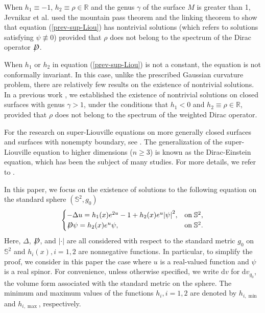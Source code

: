 \documentclass[a4paper, 12pt]{article}
\def\slashiii#1{\setbox0=\hbox{$#1$}#1\hskip-\wd0\hbox to\wd0{\hss\sl/\/\hss}}
\begin{document}
	When $h_1 \equiv-1$, $h_2 \equiv \rho\in\mathbb{R}$ and the genus $\gamma$ of the surface $M$ is greater than 1,  Jevnikar et al. \cite{jevnikar2020existence1} used the mountain pass theorem and the linking theorem to show that equation (\ref{prev-sup-Liou}) has nontrivial solutions (which refers to solutions satisfying $\psi\not \equiv0$) provided that $\rho$ does not belong to the spectrum of the Dirac operator $\slashiii{D}$.
	
	When $h_1$ or $h_2$ in equation (\ref{prev-sup-Liou}) is not a constant, the equation is not conformally invariant. In this case, unlike the prescribed Gaussian curvature problem, there are relatively few results on the existence of nontrivial solutions. In a previous work \cite{han2024existence}, we established the existence of nontrivial solutions on closed surfaces with genus $\gamma > 1$, under the conditions that $h_1 < 0$ and $h_2 \equiv \rho \in \mathbb{R}$, provided that $\rho$ does not belong to the spectrum of the weighted Dirac operator.
	
	For the research on super-Liouville equations on more generally closed surfaces and surfaces with nonempty boundary, see \cite{jevnikar2020existence1,MR4206467,jost2007super,jost2009energy,jost2014boundary,jost2014qualitative,jost2015local}. 	 The generalization of the super-Liouville equation to higher dimensions (\(n \geq 3\)) is known as the Dirac-Einstein equation, which has been the subject of many studies. For more details, we refer to \cite{MR4267625,MR4505161,MR1709232,MR1793008,MR1738150,MR3906258,MR4844577,MR4707830}.
	
	In this paper, we focus on the existence of solutions to the following equation on the standard sphere $(\mathbb{S}^2,g_0)$
	\begin{equation}\label{key-Sphere}
		\begin{cases}
			{ - \Delta u = {h_1}(x){e^{2u}} - 1 + {h_2(x)}{e^{u}}{{\left| \psi  \right|}^2},}&{{\text{on}}\;{\mathbb{S}^2},} \\
			{\slashiii{D}\psi  = h_2(x){e^{u}}\psi ,}&{{\text{on}}\;{\mathbb{S}^2}.}
		\end{cases}
	\end{equation}
	Here, $\Delta$, $\slashiii{D}$, and \( \left|  \cdot  \right| \) are all considered with respect to the standard metric \( g_0 \) on $\mathbb{S}^2$ and $h_i(x),i=1,2$ are nonnegative functions. In particular, to simplify the proof, we consider in this paper the case where \( u \) is a real-valued function and \( \psi \) is a real spinor. For convenience, unless otherwise specified, we write \( {\text{d}{v}} \) for \({\text{d}}{v_{{g_0}}} \), the volume form associated with the standard metric on the sphere. The minimum and maximum values of the functions $h_i,i=1,2$ are denoted by $h_{i,\min}$ and $h_{i,\max}$, respectively.
	
\end{document}
